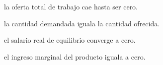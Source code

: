 \begin{opts}
    \item la oferta total de trabajo cae hasta ser cero.
    \item la cantidad demandada iguala la cantidad ofrecida.
    \item el salario real de equilibrio converge a cero.
    \item el ingreso marginal del producto iguala a cero.
\end{opts}
